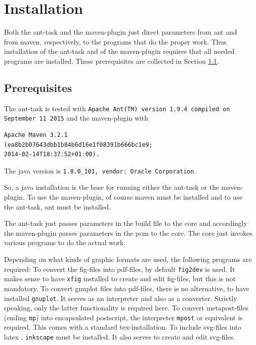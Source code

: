 \documentclass[12pt]{article}
\begin{document}
\section{Installation}

Both the ant-task and the maven-plugin just direct parameters 
from ant and from maven, respectively, 
to the programs that do the proper work. 
Thus installation of the ant-task and of the maven-plugin 
requires that all needed programs are installed. 
These prerequisites are collected in Section \ref{subsec:prerequisites}. 

\subsection{Prerequisites}\label{subsec:prerequisites}

The ant-task is tested with 
{\tt Apache Ant(TM) version 1.9.4 compiled on September 11 2015}
and the maven-plugin with 
%
\begin{verbatim}
Apache Maven 3.2.1
(ea8b2b07643dbb1b84b6d16e1f08391b666bc1e9; 
2014-02-14T18:37:52+01:00). 
\end{verbatim}
The java version is {\tt 1.8.0\_101, vendor: Oracle Corporation}. 

So, a java installation is the base for running either the ant-task 
or the maven-plugin. 
To use the maven-plugin, of course maven must be installed 
and to use the ant-task, ant must be installed. 

The ant-task just passes parameters in the build file to the core 
and accordingly the maven-plugin passes parameters in the pom 
to the core. 
The core just invokes various programs to do the actual work. 

Depending on what kinds of graphic formats are used, 
the following programs are required: 
To convert the fig-files into pdf-files, 
by default {\tt fig2dev} is used. 
It makes sense to have {\tt xfig} installed  
to create and edit fig-files, but this is not mandatory. 
To convert gnuplot files into pdf-files, there is no alternative, 
to have installed {\tt gnuplot}. 
It serves as an interpreter and also as a converter. 
Strictly speaking, only the latter functionality is required here. 
To convert metapost-files (ending {\tt mp}) into encapsulated postscript, 
the interpreter {\tt mpost} or equivalent is required. 
This comes with a standard tex-installation. 
To include svg-files into latex , 
{\tt inkscape} must be installed. 
It also serves to create and edit svg-files. 
\end{document}
